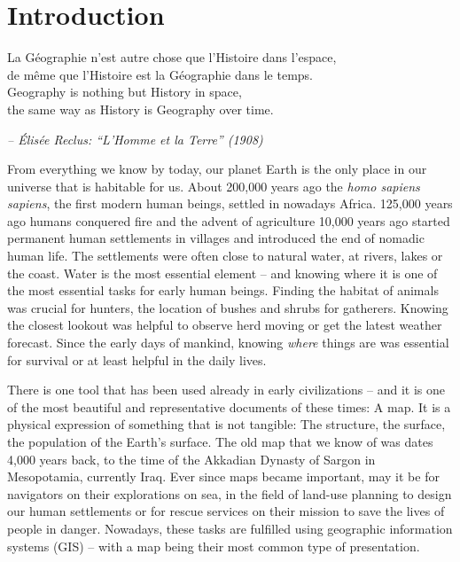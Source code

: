 
\section{Introduction}
\label{sec:introduction}

\begin{quoteit}
\large
La Géographie n’est autre chose que l’Histoire dans l’espace, \\
de même que l’Histoire est la Géographie dans le temps. \\

Geography is nothing but History in space, \\
the same way as History is Geography over time.
\end{quoteit}
\hfill \textit{-- Élisée Reclus: ``L'Homme et la Terre'' (1908)}

From everything we know by today, our planet Earth is the only place in our universe that is habitable for us. About 200,000 years ago the \emph{homo sapiens sapiens}, the first modern human beings, settled in nowadays Africa. 125,000 years ago humans conquered fire and the advent of agriculture 10,000 years ago started permanent human settlements in villages and introduced the end of nomadic human life. The settlements were often close to natural water, at rivers, lakes or the coast. Water is the most essential element -- and knowing where it is one of the most essential tasks for early human beings. Finding the habitat of animals was crucial for hunters, the location of bushes and shrubs for gatherers. Knowing the closest lookout was helpful to observe herd moving or get the latest weather forecast. Since the early days of mankind, knowing \emph{where} things are was essential for survival or at least helpful in the daily lives.

There is one tool that has been used already in early civilizations -- and it is one of the most beautiful and representative documents of these times: A map. It is a physical expression of something that is not tangible: The structure, the surface, the population of the Earth's surface. The old map that we know of was dates 4,000 years back, to the time of the Akkadian Dynasty of Sargon in Mesopotamia, currently Iraq. Ever since maps became important, may it be for navigators on their explorations on sea, in the field of land-use planning to design our human settlements or for rescue services on their mission to save the lives of people in danger. Nowadays, these tasks are fulfilled using geographic information systems (GIS) -- with a map being their most common type of presentation.

